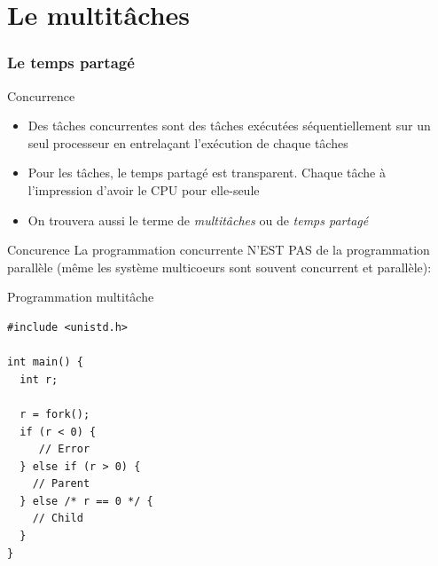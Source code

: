 %
%
%

\part{Le multitâches}

\begin{frame}
\partpage
\end{frame}

\begin{frame}
\tableofcontents[currentpart]
\end{frame}

\section{Le temps partagé}

\begin{frame}{Concurrence}
  \begin{itemize}
  \item   Des   tâches   concurrentes   sont   des   tâches   exécutées
    séquentiellement sur un seul processeur en entrelaçant l'exécution
    de chaque tâches
  \item  Pour les tâches,  le temps  partagé est  transparent.  Chaque
    tâche à l'impression d'avoir le CPU pour elle-seule
  \item  On  trouvera aussi  le  terme  de  \emph{multitâches} ou  de
    \emph{temps partagé}
  \end{itemize}
\end{frame}

\begin{frame}{Concurence}
   La programmation concurrente N'EST  PAS de la programmation parallèle
  (même les système multicoeurs sont souvent concurrent et parallèle):
  \begin{center}
  \end{center}
\end{frame}

\begin{frame}[fragile]{Programmation multitâche}
\begin{lstlisting}
#include <unistd.h>

int main() {
  int r;

  r = fork();
  if (r < 0) {
     // Error
  } else if (r > 0) {
    // Parent
  } else /* r == 0 */ {
    // Child
  }
}
\end{lstlisting}
\end{frame}

